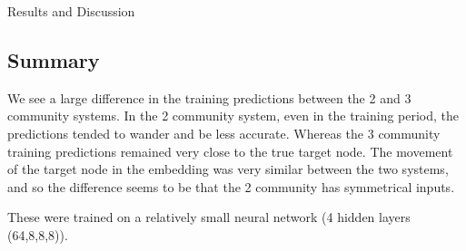 \documentclass[12pt]{amsart}
\begin{document}
\begin{section}{Results and Discussion}
            
            \subsection{Summary}
                We see a large difference in the training predictions between the 2 and 3 community systems. In the 2 community system, even in the training period, the predictions tended to wander and be less accurate. Whereas the 3 community training predictions remained very close to the true target node. The movement of the target node in the embedding was very similar between the two systems, and so the difference seems to be that the 2 community has symmetrical inputs.

                These were trained on a relatively small neural network (4 hidden layers (64,8,8,8)).


\end{section}
\end{document}

